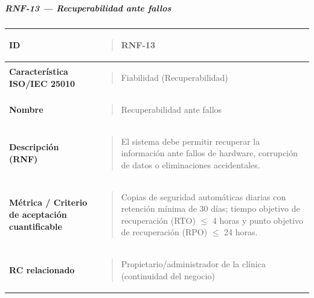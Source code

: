 \documentclass[
]{article}
\newcounter{none} %
\begin{document}
\subparagraph{RNF-13 --- Recuperabilidad ante
fallos}\label{rnf-13-recuperabilidad-ante-fallos}

{\def\LTcaptype{none} %
\begin{longtable}[]{@{}
  >{\raggedright\arraybackslash}p{}
  >{\raggedright\arraybackslash}p{}@{}}
\toprule\noalign{}
\begin{minipage}[b]{\linewidth}\raggedright
\textbf{ID}
\end{minipage} & \begin{minipage}[b]{\linewidth}\raggedright
\begin{quote}
RNF-13
\end{quote}
\end{minipage} \\
\midrule\noalign{}
\endhead
\bottomrule\noalign{}
\endlastfoot
\textbf{Característica ISO/IEC 25010} & \begin{minipage}[t]{\linewidth}\raggedright
\begin{quote}
Fiabilidad (Recuperabilidad)
\end{quote}
\end{minipage} \\
\textbf{Nombre} & \begin{minipage}[t]{\linewidth}\raggedright
\begin{quote}
Recuperabilidad ante fallos
\end{quote}
\end{minipage} \\
\textbf{Descripción (RNF)} & \begin{minipage}[t]{\linewidth}\raggedright
\begin{quote}
El sistema debe permitir recuperar la información ante fallos de
hardware, corrupción de datos o eliminaciones accidentales.
\end{quote}
\end{minipage} \\
\textbf{Métrica / Criterio de aceptación cuantificable} & \begin{minipage}[t]{\linewidth}\raggedright
\begin{quote}
Copias de seguridad automáticas diarias con retención mínima de 30
días; tiempo objetivo de recuperación (RTO) \(\leq\) 4 horas y punto
objetivo de recuperación (RPO) \(\leq\) 24 horas.
\end{quote}
\end{minipage} \\
\textbf{RC relacionado} & \begin{minipage}[t]{\linewidth}\raggedright
\begin{quote}
Propietario/administrador de la clínica (continuidad del negocio)
\end{quote}
\end{minipage} \\
\end{longtable}
}
\end{document}
